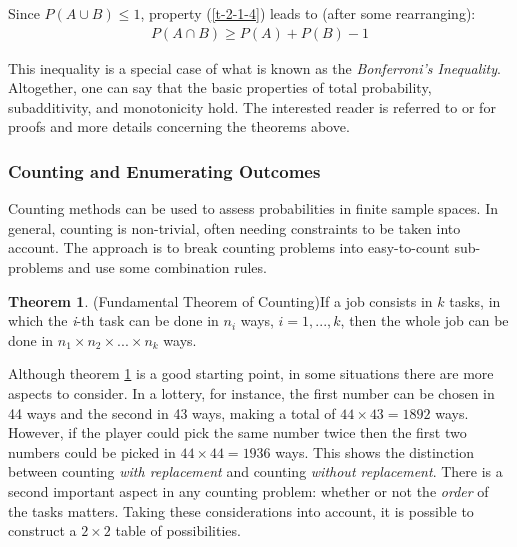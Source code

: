 \documentclass[
  oneside,
  11pt, a4paper,
  footinclude=true,
  headinclude=true,
  cleardoublepage=empty
]{scrbook}
\theoremstyle{definition}
\theoremstyle{definition}
\newtheorem{theorem}{Theorem}[section]
\begin{document}
            Since $P(A \cup B) \leq 1$, property (\ref{t-2-1-4}) leads to (after some rearranging):
            \begin{align}\label{al-6}
                P(A \cap B) \geq P(A) + P(B) - 1
            \end{align}{}
            
            This inequality is a special case of what is known as the \emph{Bonferroni's Inequality}. Altogether, one can say that the basic properties of total probability, subadditivity, and monotonicity hold. The interested reader is referred to \citep{CaseBerg:01} or \citep{RePEc:bes:amstat:v:59:y:2005:m:august:p:276-276} for proofs and more details concerning the theorems above.
            
        \subsubsection{Counting and Enumerating Outcomes}
        
        Counting methods can be used to assess probabilities in finite sample spaces. In general, counting is non-trivial, often needing constraints to be taken into account. The approach is to break counting problems into easy-to-count sub-problems and use some combination rules.
        
        \begin{theorem}{(Fundamental Theorem of Counting)}\label{t-2-1-5}
            If a job consists in $k$ tasks, in which the \emph{i}-th task can be done in $n_i$ ways, $i = 1,...,k$, then the whole job can be done in $n_1 \times n_2 \times ... \times n_k$ ways.
        \end{theorem}{}
        
        Although theorem \ref{t-2-1-5} is a good starting point, in some situations there are more aspects to consider. In a lottery, for instance, the first number can be chosen in 44 ways and the second in 43 ways, making a total of $44 \times 43 = 1892$ ways. However, if the player could pick the same number twice then the first two numbers could be picked in $44 \times 44 = 1936$ ways. This shows the distinction between counting \emph{with replacement} and counting \emph{without replacement}. There is a second important aspect in any counting problem: whether or not the \emph{order} of the tasks matters. Taking these considerations into account, it is possible to construct a $2 \times 2$ table of possibilities.
        
\end{document}
